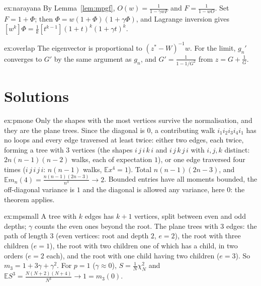 \begin{hint}{ex:narayana}
By Lemma~\ref{lem:mpgf}, $O(w)=\frac1{1-\gamma wF}$ and $F=\frac1{1-wO}$. Set $F=1+\Phi$; then $\Phi=w(1+\Phi)(1+\gamma\Phi)$, and Lagrange inversion gives $[w^k]\Phi=\frac1k[t^{k-1}](1+t)^k(1+\gamma t)^k$.
\end{hint}

\begin{hint}{ex:overlap}
The eigenvector is proportional to $(z^*-W)^{-1}w$. For the limit, $g_n'$ converges to $G'$ by the same argument as $g_n$, and $G'=\frac1{1-1/G^2}$ from $z=G+\frac1G$.
\end{hint}

\section{Solutions}

\begin{solution}{ex:pmone}
\idea Only the shapes with the most vertices survive the normalisation, and they are the plane trees.
\writeup Since the diagonal is $0$, a contributing walk $i_1i_2i_3i_4i_1$ has no loops and every edge traversed at least twice: either two edges, each twice, forming a tree with $3$ vertices (the shapes $i\,j\,i\,k\,i$ and $i\,j\,k\,j\,i$
with $i,j,k$ distinct: $2n(n-1)(n-2)$ walks, each of expectation $1$), or one edge traversed four times ($i\,j\,i\,j\,i$: $n(n-1)$ walks, $\mathbb Ex^4=1$). Total $n(n-1)(2n-3)$, and $\mathbb Em_n(4)=\frac{n(n-1)(2n-3)}{n^3}\to2$.
Bounded entries have all moments bounded, the off-diagonal variance is $1$ and the diagonal is allowed any variance, here $0$: the theorem applies.
\end{solution}

\begin{solution}{ex:mpsmall}
\idea A tree with $k$ edges has $k+1$ vertices, split between even and odd depths; $\gamma$ counts the even ones beyond the root.
\writeup The plane trees with $3$ edges: the path of length $3$ (even vertices: root and depth $2$, $e=2$), the root with three children ($e=1$), the root with two children one of which has a child, in two orders ($e=2$ each), and
the root with one child having two children ($e=3$). So $m_3=1+3\gamma+\gamma^2$. For $p=1$ ($\gamma\approx0$), $S=\frac1N\chi^2_N$ and $\mathbb ES^3=\frac{N(N+2)(N+4)}{N^3}\to1=m_3(0)$.
\end{solution}

